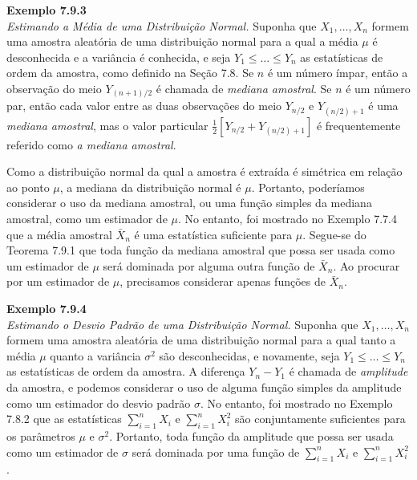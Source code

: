 \noindent\textbf{Exemplo 7.9.3} \\
\textit{Estimando a Média de uma Distribuição Normal.} Suponha que $X_1, \dots, X_n$ formem uma amostra aleatória de uma distribuição normal para a qual a média $\mu$ é desconhecida e a variância é conhecida, e seja $Y_1 \le \dots \le Y_n$ as estatísticas de ordem da amostra, como definido na Seção 7.8. Se $n$ é um número ímpar, então a observação do meio $Y_{(n+1)/2}$ é chamada de \textit{mediana amostral}. Se $n$ é um número par, então cada valor entre as duas observações do meio $Y_{n/2}$ e $Y_{(n/2)+1}$ é uma \textit{mediana amostral}, mas o valor particular $\frac{1}{2}[Y_{n/2} + Y_{(n/2)+1}]$ é frequentemente referido como \textit{a mediana amostral}.

\vspace{\baselineskip}

Como a distribuição normal da qual a amostra é extraída é simétrica em relação ao ponto $\mu$, a mediana da distribuição normal é $\mu$. Portanto, poderíamos considerar o uso da mediana amostral, ou uma função simples da mediana amostral, como um estimador de $\mu$. No entanto, foi mostrado no Exemplo 7.7.4 que a média amostral $\bar{X}_n$ é uma estatística suficiente para $\mu$. Segue-se do Teorema 7.9.1 que toda função da mediana amostral que possa ser usada como um estimador de $\mu$ será dominada por alguma outra função de $\bar{X}_n$. Ao procurar por um estimador de $\mu$, precisamos considerar apenas funções de $\bar{X}_n$.


\noindent\textbf{Exemplo 7.9.4} \\
\textit{Estimando o Desvio Padrão de uma Distribuição Normal.} Suponha que $X_1, \dots, X_n$ formem uma amostra aleatória de uma distribuição normal para a qual tanto a média $\mu$ quanto a variância $\sigma^2$ são desconhecidas, e novamente, seja $Y_1 \le \dots \le Y_n$ as estatísticas de ordem da amostra. A diferença $Y_n - Y_1$ é chamada de \textit{amplitude} da amostra, e podemos considerar o uso de alguma função simples da amplitude como um estimador do desvio padrão $\sigma$. No entanto, foi mostrado no Exemplo 7.8.2 que as estatísticas $\sum_{i=1}^{n} X_i$ e $\sum_{i=1}^{n} X_i^2$ são conjuntamente suficientes para os parâmetros $\mu$ e $\sigma^2$. Portanto, toda função da amplitude que possa ser usada como um estimador de $\sigma$ será dominada por uma função de $\sum_{i=1}^{n} X_i$ e $\sum_{i=1}^{n} X_i^2$.

\vspace{\baselineskip}

